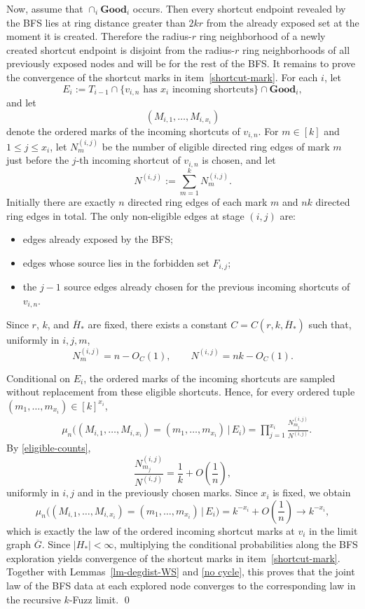 \documentclass[10pt]{amsart}
\begin{document}
Now, assume that $\cap_i\mathbf{Good}_i$ occurs. Then every shortcut
endpoint revealed by the BFS lies at ring distance greater than $2kr$ from the
already exposed set at the moment it is created. Therefore
the radius-$r$ ring neighborhood of a newly created shortcut endpoint is
disjoint from the radius-$r$ ring neighborhoods of all previously exposed
nodes and will be for the rest of the BFS. It remains to prove the convergence of the shortcut marks in
item~\eqref{shortcut-mark}. For each $i$, let
\[
E_i:=
T_{i-1}\cap
\{v_{i,n}\text{ has }x_i\text{ incoming shortcuts}\}\cap
\mathbf{Good}_i,
\]
and let
\[
(M_{i,1},\dots,M_{i,x_i})
\]
denote the ordered marks of the incoming shortcuts of $v_{i,n}$. For $m\in[k]$ and $1\le j\le x_i$, let $N_m^{(i,j)}$ be the number of eligible
directed ring edges of mark $m$ just before the $j$-th incoming shortcut of
$v_{i,n}$ is chosen, and let
\[
N^{(i,j)}:=\sum_{m=1}^k N_m^{(i,j)}.
\]
Initially there are exactly $n$ directed ring edges of each mark $m$ and $nk$
directed ring edges in total.
The only non-eligible edges at stage $(i,j)$ are:
\begin{itemize}
    \item edges already exposed by the BFS;
    \item edges whose source lies in the forbidden set $F_{i,j}$;
    \item the $j-1$ source edges already chosen for the previous incoming
    shortcuts of $v_{i,n}$.
\end{itemize}
Since $r$, $k$, and $\overline{H}_*$ are fixed, there exists a constant
$C=C(r,k,\overline{H}_*)$ such that, uniformly in $i,j,m$,
\begin{equation}\label{eligible-counts}
N_m^{(i,j)} = n - O_C(1),
\qquad
N^{(i,j)} = nk - O_C(1).
\end{equation}

Conditional on $E_i$, the ordered marks of the incoming shortcuts are sampled
without replacement from these eligible shortcuts. Hence, for every ordered
tuple $(m_1,\dots,m_{x_i})\in[k]^{x_i}$,
\begin{align*}
&\mu_n\Big(
(M_{i,1},\dots,M_{i,x_i})=(m_1,\dots,m_{x_i})
\,\Big|\, E_i
\Big) =
\prod_{j=1}^{x_i}
\frac{N_{m_j}^{(i,j)}}{N^{(i,j)}}.
\end{align*}
By \eqref{eligible-counts},
\[
\frac{N_{m_j}^{(i,j)}}{N^{(i,j)}}
=
\frac{1}{k}+O\!\left(\frac1n\right),
\]
uniformly in $i,j$ and in the previously chosen marks. Since $x_i$ is fixed, we
obtain
\[
\mu_n\Big(
(M_{i,1},\dots,M_{i,x_i})=(m_1,\dots,m_{x_i})
\,\Big|\, E_i
\Big)
=
k^{-x_i}+O\!\left(\frac1n\right)
\to
k^{-x_i},
\]
which is exactly the law of the ordered incoming shortcut marks at $v_i$ in the
limit graph $\overline{G}$.  Since $|H_*|<\infty$,
multiplying the conditional probabilities along the BFS exploration yields convergence of the shortcut marks in item~\eqref{shortcut-mark}.
Together with Lemmas~\ref{lm-degdist-WS} and \ref{no cycle}, this proves that
the joint law of the BFS data at each explored node converges to the
corresponding law in the recursive $k$-Fuzz limit.  \qed
\end{document}
